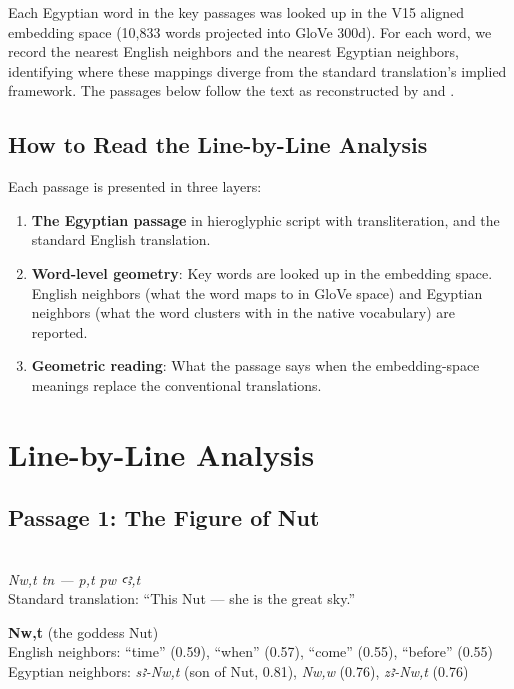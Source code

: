 \documentclass[11pt, a4paper]{article}
\newcommand{\passagehiero}[1]{{\normalfont\hierofont\fontsize{14}{17}\selectfont #1}}
\begin{document}
Each Egyptian word in the key passages was looked up in the V15 aligned embedding space (10,833 words projected into GloVe 300d). For each word, we record the nearest English neighbors and the nearest Egyptian neighbors, identifying where these mappings diverge from the standard translation's implied framework. The passages below follow the text as reconstructed by \citet{vonlieven2007book} and \citet{neugebauer1960ean}.

\subsection{How to Read the Line-by-Line Analysis}

Each passage is presented in three layers:

\begin{enumerate}
    \item {\color{passage}\textbf{The Egyptian passage}} in hieroglyphic script with transliteration, and the standard English translation.
    \item \textbf{Word-level geometry}: Key words are looked up in the embedding space. English neighbors (what the word maps to in GloVe space) and Egyptian neighbors (what the word clusters with in the native vocabulary) are reported.
    \item {\color{insight}\textbf{Geometric reading}}: What the passage says when the embedding-space meanings replace the conventional translations.
\end{enumerate}

\section{Line-by-Line Analysis}
\label{sec:lineby}

\subsection{Passage 1: The Figure of Nut}

{\color{passage}\passagehiero{𓈖𓅱𓏏𓇼 𓏏𓈖 --- 𓇯𓏏 𓊪𓅱 𓂝𓄿𓏏}\\\medskip
\textit{\small Nw,t tn --- p,t pw ꜥꜣ,t}\\
Standard translation: ``This Nut --- she is the great sky.''}

\bigskip

\noindent\textbf{Nw,t} (the goddess Nut)\\
English neighbors: ``time'' (0.59), ``when'' (0.57), ``come'' (0.55), ``before'' (0.55)\\
Egyptian neighbors: \textit{sꜣ-Nw,t} (son of Nut, 0.81), \textit{Nw,w} (0.76), \textit{zꜣ-Nw,t} (0.76)
\end{document}
